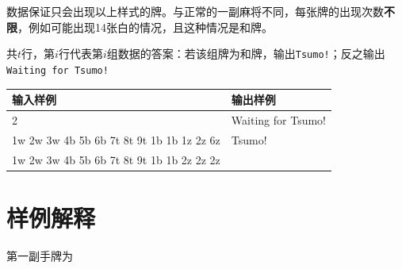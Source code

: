 \documentclass[
    lang=cn,
    color=green
]{elegantbook}
\begin{document}
{    数据保证只会出现以上样式的牌。与正常的一副麻将不同，每张牌的出现次数\textbf{不限}，例如可能出现14张白的情况，且这种情况是和牌。

}{
    共$t$行，第$i$行代表第$i$组数据的答案：若该组牌为和牌，输出\lstinline{Tsumo!}；反之输出\lstinline{Waiting for Tsumo!}

}{
\begin{tabularx}{450pt}{X|X}
    \toprule
    输入样例                                  & 输出样例           \\
    \midrule
    2                                         & Waiting for Tsumo! \\
    1w 2w 3w 4b 5b 6b 7t 8t 9t 1b 1b 1z 2z 6z & Tsumo!             \\
    1w 2w 3w 4b 5b 6b 7t 8t 9t 1b 1b 2z 2z 2z &                    \\
    \bottomrule
\end{tabularx}

}
\section*{样例解释}

第一副手牌为
\end{document}
